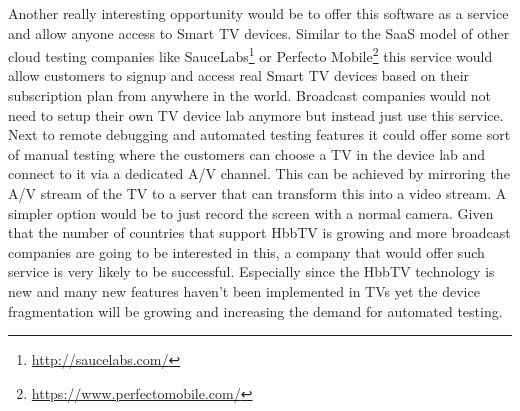 Another really interesting opportunity would be to offer this software as a service and allow anyone access to Smart TV
devices. Similar to the SaaS model of other cloud testing companies like SauceLabs\footnote{\url{http://saucelabs.com/}}
or Perfecto Mobile\footnote{\url{https://www.perfectomobile.com/}} this service would allow customers to signup and
access real Smart TV devices based on their subscription plan from anywhere in the world. Broadcast companies would
not need to setup their own TV device lab anymore but instead just use this service. Next to remote debugging and
automated testing features it could offer some sort of manual testing where the customers can choose a TV in the device
lab and connect to it via a dedicated A/V channel. This can be achieved by mirroring the A/V stream of the TV to a
server that can transform this into a video stream. A simpler option would be to just record the screen with a normal
camera. Given that the number of countries that support HbbTV is growing and more broadcast companies are going to be
interested in this, a company that would offer such service is very likely to be successful. Especially since the
HbbTV technology is new and many new features haven't been implemented in TVs yet the device fragmentation will be
growing and increasing the demand for automated testing.
